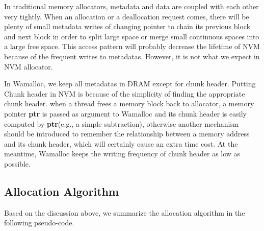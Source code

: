 \documentclass[10pt, conference, compsocconf]{IEEEtran}
\begin{document}
In traditional memory allocators, metadata and data are coupled with each other very tightly.
When an allocation or a deallocation request comes, 
there will be plenty of small metadata writes of changing pointer to chain its previous block and next block 
in order to split large space or merge small continuous spaces into a large free space.
This access pattern will probably decrease the lifetime of NVM because of the frequent writes to metadatas.
However, it is not what we expect in NVM allocator.

In Wamalloc, we keep all metadatas in DRAM except for chunk header. 
Putting Chunk header in NVM is because of the simplicity of finding the appropriate chunk header.
when a thread frees a memory block back to allocator, 
a memory pointer \textbf{ptr} is passed as argument to Wamalloc and 
its chunk header is easily computed by \textbf{ptr}(e.g., a simple subtraction),
otherwise another mechanism should be introduced to remember the relationship between a memory address and its chunk header,
which will certainly cause an extra time cost.
At the meantime, Wamalloc keeps the writing frequency of chunk header as low as possible. 

\subsection{Allocation Algorithm}

Based on the discussion above, we summarize the allocation algorithm in the following pseudo-code.
\end{document}
